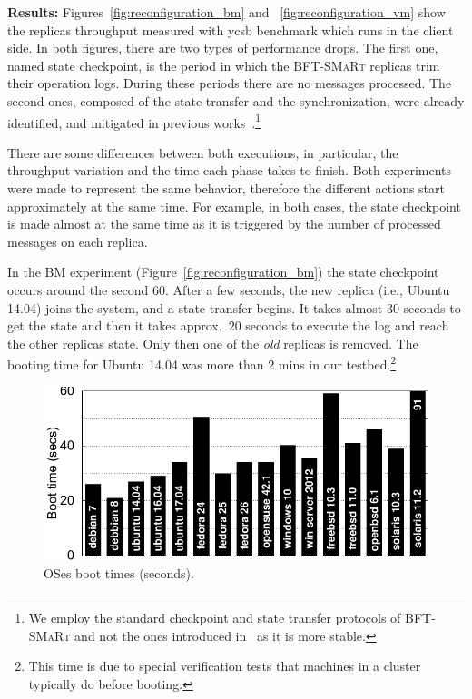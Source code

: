 \textbf{Results:}
Figures~\ref{fig:reconfiguration_bm} and ~\ref{fig:reconfiguration_vm} show the replicas throughput measured with \gls{ycsb} benchmark which runs in the client side. 
In both figures, there are two types of performance drops. 
The first one, named state checkpoint, is the period in which the \textsc{BFT-SMaRt} replicas trim their operation logs.
During these periods there are no messages processed. 
The second ones, composed of the state transfer and the synchronization, were already identified, and mitigated in previous works~\cite{Bessani:2013}.\footnote{We employ the standard checkpoint and state transfer protocols of \textsc{BFT-SMaRt} and not the ones introduced in~\cite{Bessani:2013} as it is more stable.}  

There are some differences between both executions, in particular, the throughput variation and the time each phase takes to finish.
Both experiments were made to represent the same behavior, therefore the different actions start approximately at the same time.
For example, in both cases, the state checkpoint is made almost at the same time as it is triggered by the number of processed messages on each replica.

In the BM experiment (Figure~\ref{fig:reconfiguration_bm}) the state checkpoint occurs around the second $60$.
After a few seconds, the new replica (i.e., Ubuntu 14.04) joins the system, and a state transfer begins.
It takes almost $30$ seconds to get the state and then it takes approx.~$20$ seconds to execute the log and reach the other replicas state. 
Only then one of the \emph{old} replicas is removed. 
The booting time for Ubuntu 14.04 was more than $2$ mins in our testbed.\footnote{This time is due to special verification tests that machines in a cluster typically do before booting.} 

\begin{figure}[t]
\begin{center}
\includegraphics[width=0.8\columnwidth]{images/gnuplot/vagrant/updown/boot.pdf}
\caption{OSes boot times (seconds).}
\label{fig:boot}
\end{center}
\end{figure}


